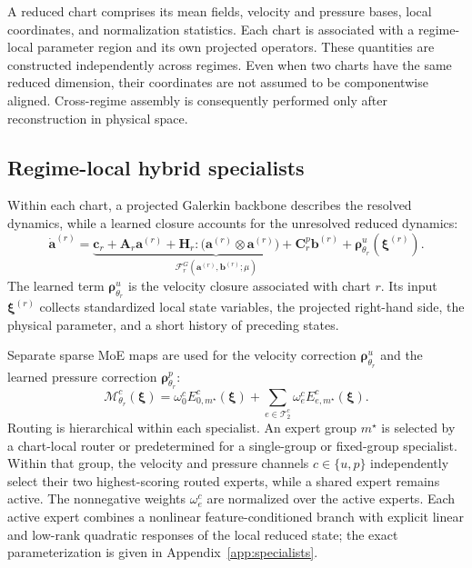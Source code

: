 \documentclass{article}
\begin{document}
A reduced chart comprises its mean fields, velocity and pressure bases, local coordinates, and normalization statistics. Each chart is associated with a regime-local parameter region and its own projected operators.
These quantities are constructed independently across regimes. Even when two charts have the same reduced dimension, their coordinates are not assumed to be componentwise aligned. Cross-regime assembly is consequently performed only after reconstruction in physical space.

\subsection{Regime-local hybrid specialists}

Within each chart, a projected Galerkin backbone describes the resolved dynamics, while a learned closure accounts for the unresolved reduced dynamics:
\begin{equation}
  \dot{\bm a}^{(r)}=
  \underbrace{\bm c_r+\bm A_r\bm a^{(r)}+
  \bm H_r:\bigl(\bm a^{(r)}\otimes\bm a^{(r)}\bigr)+
  \bm C^p_r\bm b^{(r)}}_{\mathcal F_r^{G}(\bm a^{(r)},\bm b^{(r)};\mu)}
  +\bm\rho^u_{\theta_r}(\bm\xi^{(r)}).
  \label{eq:main_specialist}
\end{equation}
The learned term $\bm\rho^u_{\theta_r}$ is the velocity closure associated with chart $r$. Its input $\bm\xi^{(r)}$ collects standardized local state variables, the projected right-hand side, the physical parameter, and a short history of preceding states.

Separate sparse MoE maps are used for the velocity correction $\bm\rho^u_{\theta_r}$ and the learned pressure correction $\bm\rho^p_{\theta_r}$:
\begin{equation}
  \mathcal M^c_{\theta_r}(\bm\xi)=
  \omega^c_0 E^c_{0,m^\star}(\bm\xi)+
  \sum_{e\in\mathcal T_2^c}\omega^c_e E^c_{e,m^\star}(\bm\xi).
  \label{eq:main_inner_moe}
\end{equation}
Routing is hierarchical within each specialist. An expert group $m^\star$ is selected by a chart-local router or predetermined for a single-group or fixed-group specialist. Within that group, the velocity and pressure channels $c\in\{u,p\}$ independently select their two highest-scoring routed experts, while a shared expert remains active. The nonnegative weights $\omega_e^c$ are normalized over the active experts. Each active expert combines a nonlinear feature-conditioned branch with explicit linear and low-rank quadratic responses of the local reduced state; the exact parameterization is given in Appendix~\ref{app:specialists}.
\end{document}
